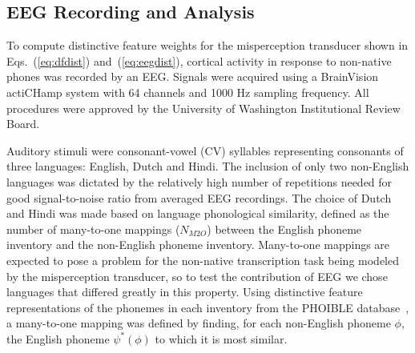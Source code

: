 \subsection{EEG Recording and Analysis}
\label{sec:methods_eeg}

To compute distinctive feature weights for the misperception
transducer shown in Eqs.~(\ref{eq:dfdist}) and~(\ref{eq:eegdist}),
cortical activity in response to non-native phones was recorded by
an EEG. Signals were acquired using a BrainVision actiCHamp 
system with 64 channels and 1000 Hz sampling frequency.
All procedures were approved by the University of Washington Institutional
Review Board.

Auditory stimuli were consonant-vowel
(CV) syllables representing consonants of three languages: English,
Dutch and Hindi. The inclusion of only two non-English languages 
was dictated by the relatively high number of
repetitions needed for good signal-to-noise ratio from averaged
EEG recordings. The choice of Dutch and Hindi was made based on language
phonological similarity, defined as the number of many-to-one mappings
($N_{M2O}$) between the English phoneme inventory
and the non-English phoneme inventory.
Many-to-one mappings are expected to pose a problem for the 
non-native transcription task being modeled by the misperception 
transducer, so to test the contribution of EEG we chose languages that 
differed greatly in this property. 
Using distinctive feature representations of the phonemes in each
inventory from the PHOIBLE database~\cite{phoible}, a many-to-one 
mapping was defined by finding, for each
non-English phoneme $\phi$, the English phoneme $\psi^*(\phi)$ to which
it is most similar.
